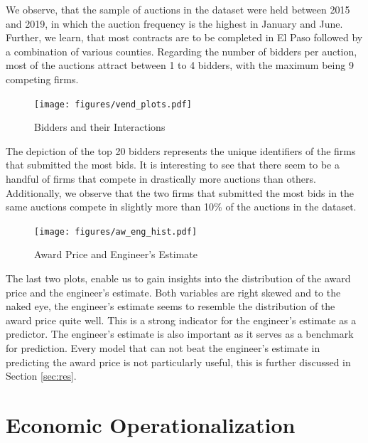 \documentclass[a4paper,12pt, headsepline]{scrartcl}
\numberwithin{equation}{section}
\begin{document}
We observe, that the sample of auctions in the dataset were held between 2015 and 2019, in which the auction frequency is the highest in January and June. Further, we learn, that most contracts are to be completed in El Paso followed by a combination of various counties. Regarding the number of bidders per auction, most of the auctions attract between 1 to 4 bidders, with the maximum being 9 competing firms.

\begin{figure}[H]
	\texttt{[image: figures/vend\_plots.pdf]}
	\caption{Bidders and their Interactions}\label{fig:vendplots}
\end{figure}

The depiction of the top 20 bidders represents the unique identifiers of the firms that submitted the most bids. It is interesting to see that there seem to be a handful of firms that compete in drastically more auctions than others. Additionally, we observe that the two firms that submitted the most bids in the same auctions compete in slightly more than 10\% of the auctions in the dataset.

\begin{figure}[H]
	\texttt{[image: figures/aw\_eng\_hist.pdf]}
	\caption{Award Price and Engineer's Estimate}\label{fig:aweng}
\end{figure}

The last two plots, enable us to gain insights into the distribution of the award price and the engineer's estimate. Both variables are right skewed and to the naked eye, the engineer's estimate seems to resemble the distribution of the award price quite well. This is a strong indicator for the engineer's estimate as a predictor. The engineer's estimate is also important as it serves as a benchmark for prediction. Every model that can not beat the engineer's estimate in predicting the award price is not particularly useful, this is further discussed in Section \ref{sec:res}.\\
\newpage
\section{Economic Operationalization}\label{sec:op}
\end{document}
